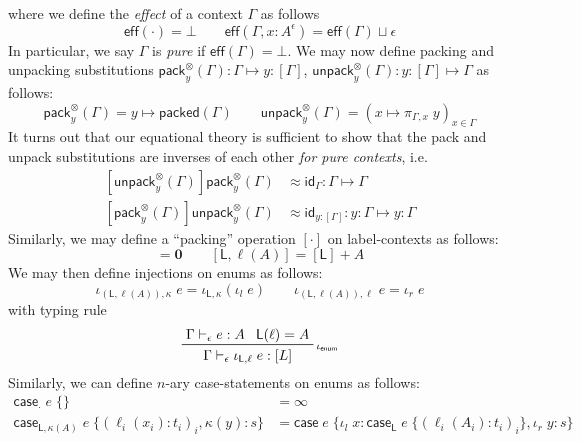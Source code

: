 \documentclass[acmsmall,screen,review]{acmart}
\newcommand{\mb}[1]{\ensuremath{\mathbf{#1}}}
\newcommand{\ms}[1]{\ensuremath{\mathsf{#1}}}
\newcommand{\lto}{:}
\newcommand{\linl}[1]{\iota_l\;{#1}}
\newcommand{\linr}[1]{\iota_r\;{#1}}
\newcommand{\casestmt}[5]{\ms{case}\;#1\;\{\linl{#2} \lto #3, \linr{#4} \lto #5\}}
\newcommand{\thyp}[3]{#1 : {#2}^{#3}}
\newcommand{\bhyp}[2]{#1 : #2}
\newcommand{\rle}[1]{{\scriptsize\textsf{#1}}}
\newcommand{\hasty}[4]{#1 \vdash_{#2} #3: {#4}}
\newcommand{\issubst}[3]{#1: #2 \mapsto #3}
\newcommand{\teqv}{\approx}
\begin{document}
where we define the \emph{effect} of a context $\Gamma$ as follows
\begin{equation}
  \ms{eff}(\cdot) = \bot \qquad 
  \ms{eff}(\Gamma, \thyp{x}{A}{\epsilon}) = \ms{eff}(\Gamma) \sqcup \epsilon
\end{equation}
In particular, we say $\Gamma$ is \emph{pure} if $\ms{eff}(\Gamma) = \bot$. We may now define
packing and unpacking substitutions
$\issubst{\ms{pack}_y^\otimes(\Gamma)}{\Gamma}{\bhyp{y}{[\Gamma]}}$,
$\issubst{\ms{unpack}_y^\otimes(\Gamma)}{\bhyp{y}{[\Gamma]}}{\Gamma}$ as follows:
\begin{equation}
  \ms{pack}_y^\otimes(\Gamma) = y \mapsto \ms{packed}(\Gamma) \qquad
  \ms{unpack}_y^\otimes(\Gamma) = (x \mapsto \pi_{\Gamma, x}\;y)_{x \in \Gamma}
\end{equation}
It turns out that our equational theory is sufficient to show that the pack and unpack substitutions
are inverses of each other \emph{for pure contexts}, i.e.
\begin{equation}
  \begin{aligned}
  \issubst
    {[\ms{unpack}_y^\otimes(\Gamma)]\ms{pack}_y^\otimes(\Gamma) 
      &\teqv \ms{id}_{\Gamma}}{\Gamma}{\Gamma}
  \\
  \issubst
    {[\ms{pack}_y^\otimes(\Gamma)]\ms{unpack}_y^\otimes(\Gamma) &\teqv \ms{id}_{\bhyp{y}{[\Gamma]}}}
    {\bhyp{y}{\Gamma}}{\bhyp{y}{\Gamma}}
  \end{aligned}
\end{equation}
Similarly, we may define a ``packing'' operation $[\cdot]$ on label-contexts as follows:
\begin{equation}
  [\cdot] = \mb{0} \qquad [\ms{L}, \ell(A)] = [\ms{L}] + A
\end{equation}
We may then define injections on enums as follows:
\begin{equation}
  \iota_{(\ms{L}, \ell(A)), \kappa}\;e = \iota_{\ms{L}, \kappa}(\iota_l\;e) \qquad
  \iota_{(\ms{L}, \ell(A)), \ell}\;e = \iota_r\;e
\end{equation}
with typing rule
\begin{equation}
  \prftree[r]{\rle{$\iota_{\ms{enum}}$}}
    {\hasty{\Gamma}{\epsilon}{e}{A}}
    {\ms{L}(\ell) = A}
    {\hasty{\Gamma}{\epsilon}{\iota_{\ms{L}, \ell}\;e}{[L]}}
\end{equation}
Similarly, we can define $n$-ary case-statements on enums as follows:
\begin{equation}
  \begin{aligned}
  \ms{case}_\cdot\;e\;\{\} &= \infty \\
  \ms{case}_{\ms{L}, \kappa(A)}\;e\;\{(\ell_i(x_i): t_i)_i, \kappa(y): s\}
  &= \casestmt{e}{x}{\ms{case}_{\ms{L}}\;e\;\{(\ell_i(A_i): t_i)_i\}}{y}{s}
  \end{aligned}
\end{equation}
\end{document}
